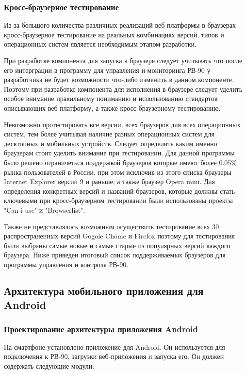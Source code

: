 \subsubsection{ Кросс-браузерное тестирование}
Из-за большого количества различных реализаций веб-платформы в браузерах кросс-браузерное тестирование на реальных комбинациях версий, типов и операционных систем является необходимым этапом разработки.

При разработке компонента для запуска в браузере следует учитывать что после его интерграции в программу для управления и мониторинга РВ-90 у разработчика не будет возможности что-либо изменить в данном компоненте. Поэтому при разработке компонента для исполнения в браузере следует уделить особое внимание правильному пониманию и использованию стандартов описывающих веб-платформу, а также кросс-браузерному тестированию. 

Невозможно протестировать все версии, всех браузеров для всех операционных систем, тем более учитывая наличие разных операционных систем для десктопных и мобильных устройств. 
Следует определить каким именно браузерам стоит уделить внимание при тестировании. 
Для данной программы было решено ограничеться поддержкой браузеров которые имеют более 0.05\% рынка пользователей в России, при этом исключив из этого списка браузеры Internet Explorer версии 9 и раньше, а также браузер Opera mini. Для определения конкретных версий и названий браузеров, которые должны стать ключевыми при кросс-браузерном тестировании были использованы проекты "Can i use" и "Browserlist".

Также не представлялось возможным осуществить тестирование всех 30 распространенных версий Gogole Chome и Firefox поэтому для тестирования были выбраны самые новые и самые старые из популярных версий каждого браузера.
Ниже приведен итоговый список поддерживаемых браузеров для программы управления и контроля РВ-90.



\newpage
\subsection{Архитектура мобильного приложения для Android}

\subsubsection{Проектирование архитектуры приложения Android}
На смартфоне установлено приложение для Android. Он используется для подключения к РВ-90, загрузки веб-приложения и запуска его. Он должен содержать следующие модули:

